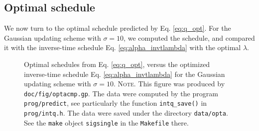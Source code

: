 \documentclass[reprint, floatfix]{revtex4-1}
\newcommand{\note}[1]{{\color{DarkGreen}\footnotesize \textsc{Note.} #1}}
\begin{document}
%
%
%
%
%


\subsection{Optimal schedule}


We now turn to the optimal schedule
predicted by Eq. \eqref{eq:q_opt}.
%
For the Gaussian updating scheme
with $\sigma = 10$,
we computed the schedule,
and compared it with the inverse-time schedule
Eq. \eqref{eq:alpha_invtlambda}
with the optimal $\lambda$.

\begin{figure}[h]
\begin{center}
  \caption{
    \label{fig:optacmp}
    Optimal schedules from Eq. \eqref{eq:q_opt},
    versus the optimized inverse-time schedule
    Eq. \eqref{eq:alpha_invtlambda}
    for the Gaussian updating scheme
    with $\sigma = 10$.
    \note{This figure was produced by \texttt{doc/fig/optacmp.gp}.
      The data were computed by the program \texttt{prog/predict},
      see particularly the function \texttt{intq\_save()}
      in \texttt{prog/intq.h}.
      The data were saved under the directory \texttt{data/opta}.
      See the \texttt{make} object \texttt{sigsingle}
      in the \texttt{Makefile} there.
    }%
  }
\end{center}
\end{figure}
\end{document}
